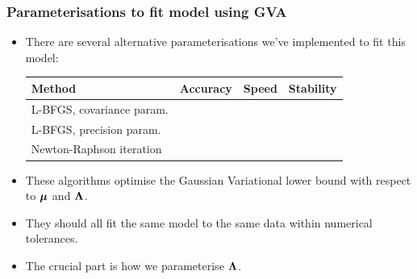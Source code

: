 \documentclass{beamer}
\begin{document}
	\begin{frame}
		\frametitle{Parameterisations to fit model using GVA}
		\begin{itemize}
			\item There are several \mbox{alternative} parameterisations we've implemented
			      to fit this model:
			      \begin{tabular}{|l|ccc|}
			      	\hline
			      	Method                    & Accuracy   & Speed      & Stability  \\
			      	\hline
			      	L-BFGS, covariance param. & \checkmark &            & \checkmark \\
			      	L-BFGS, precision param.  & \checkmark & \checkmark & \checkmark \\
			      	Newton-Raphson iteration  & \checkmark & \checkmark &            \\
			      	\hline
			      \end{tabular}	
			\item These algorithms optimise the Gaussian Variational lower bound with respect to
			      ${\boldsymbol \mu}$ and ${\boldsymbol \Lambda}$.
			\item They should all fit the same model to the same data
			      within numerical tolerances.
			\item The crucial part is how we parameterise ${\boldsymbol \Lambda}$.
		\end{itemize}
	\end{frame}
			
\end{document}
